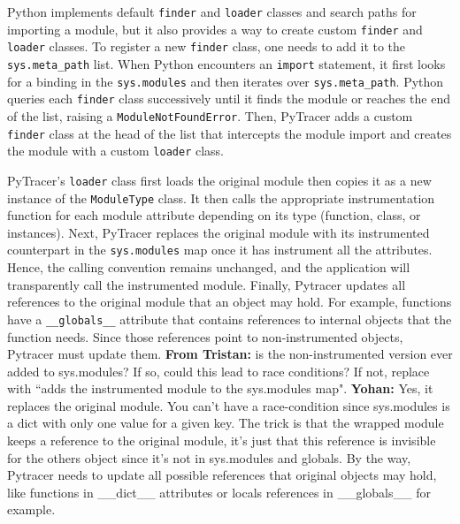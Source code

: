 \documentclass[11pt]{article}
\newcommand{\tristan}[1]{\color{orange}\textbf{From Tristan:} #1\color{black}\xspace}
\newcommand{\Yohan}[1]{\color{green!75!black}\textbf{Yohan:} #1\color{black}\xspace}
\newcommand{\pytracer}[0]{PyTracer\xspace}
\begin{document}
Python implements default \texttt{finder} and \texttt{loader} classes and search paths for importing a module, but it also provides a way to create custom \texttt{finder} and \texttt{loader} classes.
To register a new \texttt{finder} class, one needs to add it to the \texttt{sys.meta\_path} list.
When Python encounters an \texttt{import} statement, it first looks for a binding in the \texttt{sys.modules}
and then iterates over \texttt{sys.meta\_path}.
Python queries each \texttt{finder} class successively until it finds the module or reaches the end of the list, raising a \texttt{ModuleNotFoundError}. Then, \pytracer adds a custom \texttt{finder} class at the head of the list that intercepts
the module import and creates the module with a custom \texttt{loader} class.

\pytracer's \texttt{loader} class first loads the original module then copies it as a new instance of the \texttt{ModuleType} class. It then calls the appropriate instrumentation function for each module attribute depending on its type (function, class, or instances). Next, \pytracer replaces the original module with its instrumented counterpart in the \texttt{sys.modules} map once it has instrument all the attributes. Hence, the calling convention remains unchanged, and the application will transparently call the instrumented module. Finally, Pytracer updates all references to the original module that an object may hold. For example, functions have a \texttt{\_\_globals\_\_} attribute that contains references to internal objects that the function needs. Since those references point to non-instrumented objects, Pytracer must update them.
\tristan{is the non-instrumented version ever added to sys.modules? If so, could this lead to race conditions? If not, replace with ``adds the instrumented module to the sys.modules map"}. 
\Yohan{Yes, it replaces the original module. You can't have a race-condition since sys.modules is a dict with only one value for a given key. The trick is that the wrapped module keeps a reference to the original module, it's just that this reference is invisible for the others object since it's not in sys.modules and globals. By the way, Pytracer needs to update all possible references that original objects may hold, like functions in \_\_dict\_\_ attributes or locals references in \_\_globals\_\_ for example.}

\end{document}

